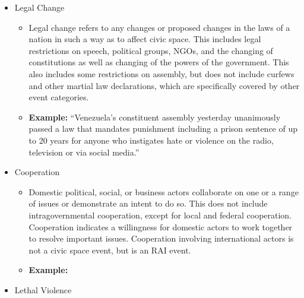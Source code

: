 \documentclass[
  letterpaper,
  DIV=11,
  numbers=noendperiod]{scrartcl}
\providecommand{\tightlist}{%
  \setlength{\itemsep}{0pt}\setlength{\parskip}{0pt}}\usepackage{longtable,booktabs,array}
\begin{document}
\begin{itemize}
  \begin{itemize}
  \tightlist
  \item
    Legal action refers to the prosecution or investigation of criminal
    activity or disputes over government authority, as well as the
    trials, convictions or dismissals that result. This event is related
    to civic space if the targeted people are part of an opposition
    movement or party, current and former government officials, a civil
    society organization, an NGO, a media organization or member, a
    (legal or illegal) business leader, member of minority group, or a
    protest. This specifically does not include arrests, which are
    defined as its own event type. Defamation cases are a subset of
    `Legal Action' (see above).
  \item
    \textbf{Example:} ``Kosovo President is Indicted for War Crimes for
    Role in War with Serbia.''
  \end{itemize}
\item
  Legal Change

  \begin{itemize}
  \tightlist
  \item
    Legal change refers to any changes or proposed changes in the laws
    of a nation in such a way as to affect civic space. This includes
    legal restrictions on speech, political groups, NGOs, and the
    changing of constitutions as well as changing of the powers of the
    government. This also includes some restrictions on assembly, but
    does not include curfews and other martial law declarations, which
    are specifically covered by other event categories.
  \item
    \textbf{Example:} ``Venezuela's constituent assembly yesterday
    unanimously passed a law that mandates punishment including a prison
    sentence of up to 20 years for anyone who instigates hate or
    violence on the radio, television or via social media.''
  \end{itemize}
\item
  Cooperation

  \begin{itemize}
  \tightlist
  \item
    Domestic political, social, or business actors collaborate on one or
    a range of issues or demonstrate an intent to do so. This does not
    include intragovernmental cooperation, except for local and federal
    cooperation. Cooperation indicates a willingness for domestic actors
    to work together to resolve important issues. Cooperation involving
    international actors is not a civic space event, but is an RAI
    event.
  \item
    \textbf{Example:}
  \end{itemize}
\item
  Lethal Violence


\end{itemize}
\end{document}
